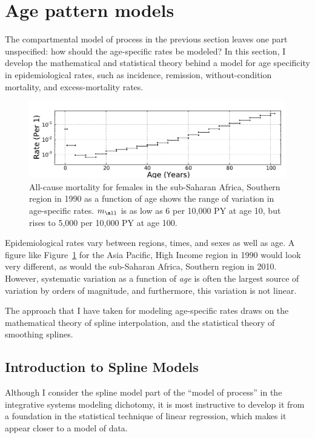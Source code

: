 \section{Age pattern models}
\label{theory-age_pattern_model}
The compartmental model of process in the previous section leaves one
part unspecified: how should the age-specific rates be modeled?  In
this section, I develop the mathematical and statistical theory behind
a model for age specificity in epidemiological rates, such as
incidence, remission, without-condition mortality, and
excess-mortality rates.

\begin{figure}[h]
\begin{center}
\includegraphics[width=\textwidth]{ssas-mx_female_1990.pdf}
\caption{All-cause mortality for females in the sub-Saharan Africa,
  Southern region in 1990 as a function of age shows the range of
  variation in age-specific rates.  $m_{\all}$ is as low as 6 per
  10,000 PY at age 10, but rises to 5,000 per 10,000 PY at age 100.}
\label{ssas-mx_female_1990}
\end{center}
\end{figure}

Epidemiological rates vary between regions, times, and sexes as well
as age.  A figure like Figure~\ref{ssas-mx_female_1990} for the Asia
Pacific, High Income region in 1990 would look very different, as
would the sub-Saharan Africa, Southern region in 2010. However,
systematic variation as a function of \emph{age} is often the largest
source of variation by orders of magnitude, and furthermore, this
variation is not linear.

The approach that I have taken for modeling age-specific rates draws
on the mathematical theory of spline interpolation, and the
statistical theory of smoothing splines.

\subsection{Introduction to Spline Models}

Although I consider the spline model part of the ``model of process''
in the integrative systems modeling dichotomy, it is most instructive
to develop it from a foundation in the statistical technique of linear
regression, which makes it appear closer to a model of data.

